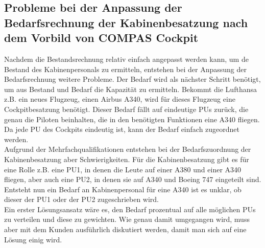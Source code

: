 \documentclass [12pt, a4paper, oneside, titlepage, ngerman]{article}
\begin{document}
\subsection{Probleme bei der Anpassung der Bedarfsrechnung der Kabinenbesatzung nach dem Vorbild von COMPAS Cockpit}
Nachdem die Bestandsrechnung relativ einfach angepasst werden kann, um de Bestand des Kabinenpersonals zu ermitteln, entstehen bei der Anpassung der Bedarfsrechnung weitere Probleme. Der Bedarf wird als nächster Schritt benötigt, um aus Bestand und Bedarf die Kapazität zu ermitteln. Bekommt die Lufthansa z.B. ein neues Flugzeug, einen Airbus A340, wird für dieses Flugzeug eine Cockpitbesatzung benötigt. Dieser Bedarf fällt auf eindeutige \acp{PU} zurück, die genau die Piloten beinhalten, die in den benötigten Funktionen eine A340 fliegen. Da jede \ac{PU} des Cockpits eindeutig ist, kann der Bedarf einfach zugeordnet werden. \\
Aufgrund der Mehrfachqualifikationen entstehen bei der Bedarfszuordnung der Kabinenbesatzung aber Schwierigkeiten. Für die Kabinenbesatzung gibt es für eine Rolle z.B. eine \ac{PU}1, in denen die Leute auf einer A380 und einer A340 fliegen, aber auch eine \ac{PU}2, in denen sie auf A340 und Boeing 747 eingeteilt sind. Entsteht nun ein Bedarf an Kabinenpersonal für eine A340 ist es unklar, ob dieser der \ac{PU}1 oder der \ac{PU}2 zugeschrieben wird. \\
Ein erster Lösungsansatz wäre es, den Bedarf prozentual auf alle möglichen \acp{PU} zu verteilen und diese zu gewichten. Wie genau damit umgegangen wird, muss aber mit dem Kunden ausführlich diskutiert werden, damit man sich auf eine Lösung einig wird.
\end{document}
